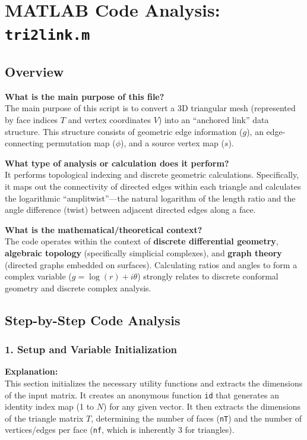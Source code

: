 
\chapter{MATLAB Code Analysis: \texttt{tri2link.m}}
\date{}

\maketitle

\section{Overview}

\textbf{What is the main purpose of this file?} \\
The main purpose of this script is to convert a 3D triangular mesh (represented by face indices $T$ and vertex coordinates $V$) into an ``anchored link'' data structure. This structure consists of geometric edge information ($g$), an edge-connecting permutation map ($\phi$), and a source vertex map ($s$).

\textbf{What type of analysis or calculation does it perform?} \\
It performs topological indexing and discrete geometric calculations. Specifically, it maps out the connectivity of directed edges within each triangle and calculates the logarithmic ``amplitwist''---the natural logarithm of the length ratio and the angle difference (twist) between adjacent directed edges along a face.

\textbf{What is the mathematical/theoretical context?} \\
The code operates within the context of \textbf{discrete differential geometry}, \textbf{algebraic topology} (specifically simplicial complexes), and \textbf{graph theory} (directed graphs embedded on surfaces). Calculating ratios and angles to form a complex variable ($g = \log(r) + i\theta$) strongly relates to discrete conformal geometry and discrete complex analysis.

\section{Step-by-Step Code Analysis}

\subsection{1. Setup and Variable Initialization}
\textbf{Explanation:} \\
This section initializes the necessary utility functions and extracts the dimensions of the input matrix. It creates an anonymous function \texttt{id} that generates an identity index map (1 to $N$) for any given vector. It then extracts the dimensions of the triangle matrix $T$, determining the number of faces (\texttt{nT}) and the number of vertices/edges per face (\texttt{nf}, which is inherently 3 for triangles).

